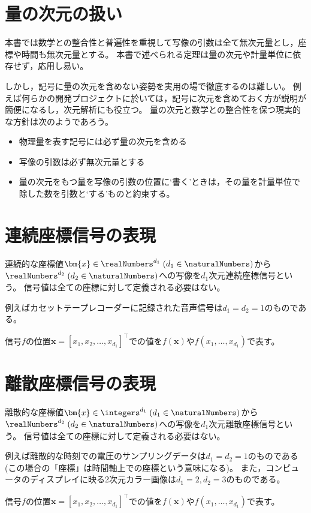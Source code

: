 	\chapter{量の次元の扱い}
		本書では数学との整合性と普遍性を重視して写像の引数は全て無次元量とし，座標や時間も無次元量とする。
		本書で述べられる定理は量の次元や計量単位に依存せず，応用し易い。
		\par
		しかし，記号に量の次元を含めない姿勢を実用の場で徹底するのは難しい。
		例えば何らかの開発プロジェクトに於いては，記号に次元を含めておく方が説明が簡便になるし，次元解析にも役立つ。
		量の次元と数学との整合性を保つ現実的な方針は次のようであろう。
		\begin{itemize}
			\item 物理量を表す記号には必ず量の次元を含める
			\item 写像の引数は必ず無次元量とする
			\item 量の次元をもつ量を写像の引数の位置に‘書く’ときは，その量を計量単位で除した数を引数と‘する’ものと約束する。
		\end{itemize}
	\chapter{連続座標信号の表現}
		連続的な座標値$\bm{x}\in\realNumbers^{d_1}\;(d_1\in\naturalNumbers)$から$\realNumbers^{d_2}\;(d_2\in\naturalNumbers)$への写像を$d_1$次元連続座標信号という。
		信号値は全ての座標に対して定義される必要はない。
		\par
		例えばカセットテープレコーダーに記録された音声信号は$d_1=d_2=1$のものである。
		\par
		信号$f$の位置$\bm{x} = [x_1,x_2,\dots,x_{d_1}]^\top$での値を$f(\bm{x})$や$f(x_1,\dots,x_{d_1})$で表す。
	\chapter{離散座標信号の表現}
		離散的な座標値$\bm{x}\in\integers^{d_1}\;(d_1\in\naturalNumbers)$から$\realNumbers^{d_2}\;(d_2\in\naturalNumbers)$への写像を$d_1$次元離散座標信号という。
		信号値は全ての座標に対して定義される必要はない。
		\par
		例えば離散的な時刻での電圧のサンプリングデータは$d_1=d_2=1$のものである(この場合の「座標」は時間軸上での座標という意味になる)。
		また，コンピュータのディスプレイに映る2次元カラー画像は$d_1=2,d_2=3$のものである。
		\par
		信号$f$の位置$\bm{x} = [x_1,x_2,\dots,x_{d_1}]^\top$での値を$f(\bm{x})$や$f(x_1,\dots,x_{d_1})$で表す。
